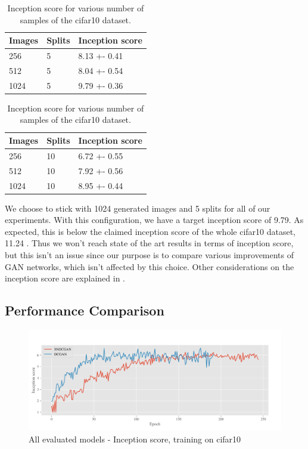 \begin{table}[h]
\centering
\setlength{\tabcolsep}{0.5em} %

\begin{subtable}{.5\textwidth}
\centering

\begin{tabular}{l l l}
\toprule
Images & Splits & Inception score  \\ 
\midrule
      256  & 5 & 8.13 +- 0.41 \\   
      512  & 5 & 8.04 +- 0.54 \\ 
      1024 & 5 & 9.79 +- 0.36 \\
\bottomrule
\end{tabular}

\end{subtable}%
\begin{subtable}{.5\textwidth}
\centering

\begin{tabular}{l l l}
\toprule
Images & Splits & Inception score  \\ 
\midrule
      256  & 10 & 6.72 +- 0.55 \\   
      512  & 10 & 7.92 +- 0.56\\ 
      1024 & 10 & 8.95 +- 0.44 \\
\bottomrule
\end{tabular}
\end{subtable}%
%
\vspace{0.3cm}
\caption{Inception score for various number of samples of the cifar10 dataset.}
\label{table:exp-isc}
\end{table}%
We choose to stick with 1024 generated images and 5 splits for all of our experiments. With this configuration, we have a target inception score of 9.79. As expected, this is below the claimed inception score of the whole cifar10 dataset, 11.24 \cite{salimans2016improved}. Thus we won't reach state of the art results in terms of inception score, but this isn't an issue since our purpose is to compare various improvements of GAN networks, which isn't affected by this choice. Other considerations on the inception score are explained in \cite{barratt2018note}.








\subsection{Performance Comparison}

\begin{figure}[h]
\centering
\includegraphics[width=\textwidth]{../code/results/figures/all_cifar10_is.png}
\caption{All evaluated models - Inception score, training on cifar10}
\label{fig:exp-all-is}
\end{figure}

